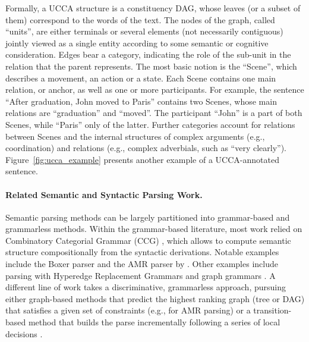 \documentclass[11pt]{article}
\newcommand{\figref}[1]{Figure~\ref{#1}}
\begin{document}
Formally, a UCCA structure is a constituency DAG, whose leaves (or a subset of them) correspond to the words of the text. The nodes of the graph, called ``units'', are either terminals or several elements (not necessarily contiguous) jointly viewed as a single entity according to some semantic or cognitive consideration.
Edges bear a category, indicating the role of the sub-unit in the relation that the parent represents. 
The most basic notion is the ``Scene'', which describes a movement, an action or a state.
Each Scene contains one main relation, or anchor, as well as one or more participants. 
For example, the sentence ``After graduation, John moved to Paris'' contains two Scenes, whose main relations are ``graduation'' and ``moved''. The participant ``John'' is a part of both Scenes, while ``Paris'' only of the latter. Further categories account for relations between Scenes and the internal structures of complex arguments (e.g., coordination) and relations (e.g., complex adverbials, such as ``very clearly''). \figref{fig:ucca_example} presents another example of a UCCA-annotated sentence. 

\paragraph{Related Semantic and Syntactic Parsing Work.}
Semantic parsing methods can be largely partitioned into grammar-based and grammarless methods.
Within the grammar-based literature, most work relied on Combinatory Categorial Grammar (CCG)
\cite{Steedman:00}, which allows to compute semantic structure compositionally from the
syntactic derivations. Notable examples include the Boxer parser \cite{bos2005towards}
and the AMR parser by .
Other examples include parsing with Hyperedge Replacement Grammars
\cite{jones2012semantics,chiang2013parsing,peng2015synchronous} and
graph grammars \cite{koller2015semantic}.
A different line of work takes a discriminative, grammarless approach,
pursuing either graph-based methods that predict the highest ranking graph
(tree or DAG) that satisfies a given set of constraints
(e.g.,  for AMR parsing)
or a transition-based method that builds the parse incrementally following a series of local
decisions \cite[and much subsequent work]{Nivre03anefficient}.
\end{document}
